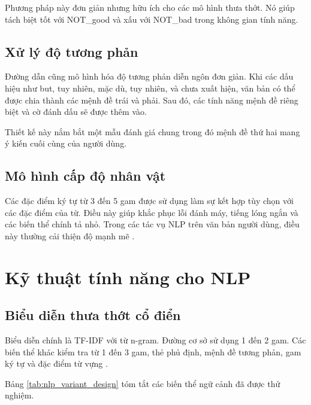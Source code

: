\documentclass[12pt,a4paper]{article}
\begin{document}
Phương pháp này đơn giản nhưng hữu ích cho các mô hình thưa thớt. Nó giúp tách biệt tốt với NOT\_good và xấu với NOT\_bad trong không gian tính năng.

\subsection{Xử lý độ tương phản}
Đường dẫn cũng mô hình hóa độ tương phản diễn ngôn đơn giản. Khi các dấu hiệu như but, tuy nhiên, mặc dù, tuy nhiên, và chưa xuất hiện, văn bản có thể được chia thành các mệnh đề trái và phải. Sau đó, các tính năng mệnh đề riêng biệt và cờ đánh dấu sẽ được thêm vào.

Thiết kế này nắm bắt một mẫu đánh giá chung trong đó mệnh đề thứ hai mang ý kiến cuối cùng của người dùng.

\subsection{Mô hình cấp độ nhân vật}
Các đặc điểm ký tự từ 3 đến 5 gam được sử dụng làm sự kết hợp tùy chọn với các đặc điểm của từ. Điều này giúp khắc phục lỗi đánh máy, tiếng lóng ngắn và các biến thể chính tả nhỏ. Trong các tác vụ NLP trên văn bản người dùng, điều này thường cải thiện độ mạnh mẽ \cite{joulin2017}.

\section{Kỹ thuật tính năng cho NLP}
\subsection{Biểu diễn thưa thớt cổ điển}
Biểu diễn chính là TF-IDF với từ n-gram. Đường cơ sở sử dụng 1 đến 2 gam. Các biến thể khác kiểm tra từ 1 đến 3 gam, thẻ phủ định, mệnh đề tương phản, gam ký tự và đặc điểm từ vựng \cite{manning2008ir,wang2012}.

Bảng \ref{tab:nlp_variant_design} tóm tắt các biến thể ngữ cảnh đã được thử nghiệm.
\end{document}
